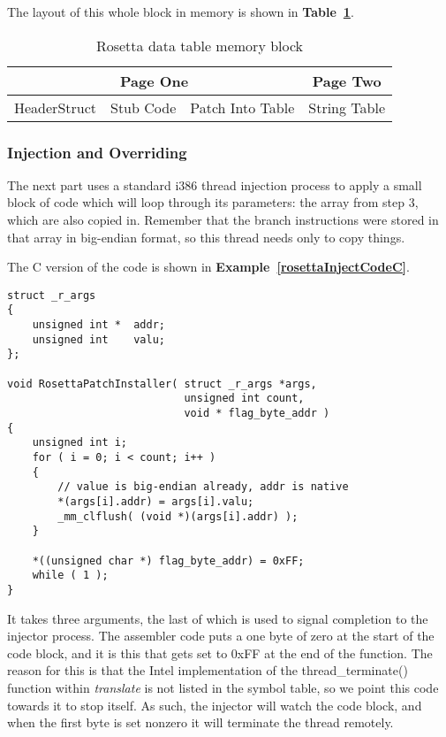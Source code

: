 \documentclass[english]{article}
\begin{document}
The layout of this whole block in memory is shown in \textbf{Table~\ref{memoryBlock}}.

\begin{table}[h!]
  \begin{center}
    \begin{tabular}{| c | c | c | c |}
      \hline
      \multicolumn{3}{|c|}{Page One} & Page Two \\
      \hline
      HeaderStruct & Stub Code & Patch Into Table & String Table \\
      \hline
    \end{tabular}
  \end{center}
  \caption{Rosetta data table memory block}
  \label{memoryBlock}
\end{table}

\subsubsection{Injection and Overriding}
The next part uses a standard i386 thread injection process to apply a small block of code which will loop through its parameters: the array from step 3, which are also copied in. Remember that the branch instructions were stored in that array in big-endian format, so this thread needs only to copy things.

The C version of the code is shown in \textbf{Example~\ref{rosettaInjectCodeC}}.

\begin{lstlisting}[label= rosettaInjectCodeC, caption=Injected code\, C implementation]
struct _r_args
{
    unsigned int *  addr;
    unsigned int    valu;
};

void RosettaPatchInstaller( struct _r_args *args,
                            unsigned int count,
                            void * flag_byte_addr )
{
    unsigned int i;
    for ( i = 0; i < count; i++ )
    {
        // value is big-endian already, addr is native
        *(args[i].addr) = args[i].valu;
        _mm_clflush( (void *)(args[i].addr) );
    }

    *((unsigned char *) flag_byte_addr) = 0xFF;
    while ( 1 );
}
\end{lstlisting}

It takes three arguments, the last of which is used to signal completion to the injector process. The assembler code puts a one byte of zero at the start of the code block, and it is this that gets set to 0xFF at the end of the function. The reason for this is that the Intel implementation of the thread\_terminate() function within \textsl{translate} is not listed in the symbol table, so we point this code towards it to stop itself. As such, the injector will watch the code block, and when the first byte is set nonzero it will terminate the thread remotely.
\end{document}
